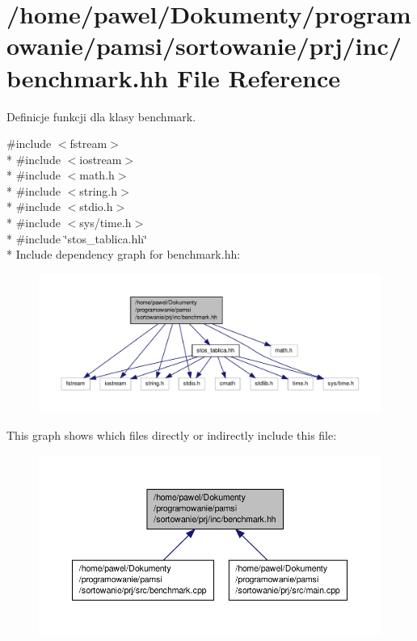 \hypertarget{benchmark_8hh}{\section{/home/pawel/\-Dokumenty/programowanie/pamsi/sortowanie/prj/inc/benchmark.hh File Reference}
\label{benchmark_8hh}
}


Definicje funkcji dla klasy benchmark.  


{\ttfamily \#include $<$fstream$>$}\\*
{\ttfamily \#include $<$iostream$>$}\\*
{\ttfamily \#include $<$math.\-h$>$}\\*
{\ttfamily \#include $<$string.\-h$>$}\\*
{\ttfamily \#include $<$stdio.\-h$>$}\\*
{\ttfamily \#include $<$sys/time.\-h$>$}\\*
{\ttfamily \#include \char`\"{}stos\-\_\-tablica.\-hh\char`\"{}}\\*
Include dependency graph for benchmark.\-hh\-:\nopagebreak
\begin{figure}[H]
\begin{center}
\leavevmode
\includegraphics[width=350pt]{benchmark_8hh__incl}
\end{center}
\end{figure}
This graph shows which files directly or indirectly include this file\-:\nopagebreak
\begin{figure}[H]
\begin{center}
\leavevmode
\includegraphics[width=350pt]{benchmark_8hh__dep__incl}
\end{center}
\end{figure}
